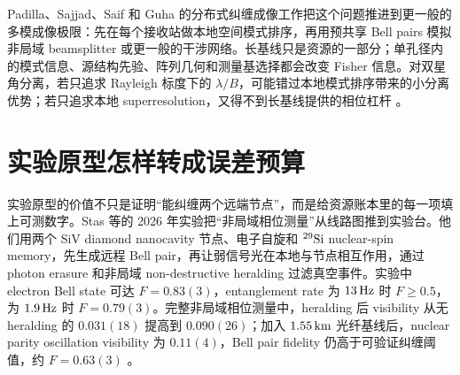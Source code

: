 Padilla、Sajjad、Saif 和 Guha 的分布式纠缠成像工作把这个问题推进到更一般的多模成像极限：先在每个接收站做本地空间模式排序，再用预共享 Bell pairs 模拟非局域 beamsplitter 或更一般的干涉网络。长基线只是资源的一部分；单孔径内的模式信息、源结构先验、阵列几何和测量基选择都会改变 Fisher 信息。对双星角分离，若只追求 Rayleigh 标度下的 \(\lambda/B\)，可能错过本地模式排序带来的小分离优势；若只追求本地 superresolution，又得不到长基线提供的相位杠杆 \citep{2026PhRvA.113a2608P,2025PhRvR...7d3278Z}。

\section{实验原型怎样转成误差预算}

实验原型的价值不只是证明“能纠缠两个远端节点”，而是给资源账本里的每一项填上可测数字。Stas 等的 2026 年实验把“非局域相位测量”从线路图推到实验台。他们用两个 SiV diamond nanocavity 节点、电子自旋和 \({}^{29}{\rm Si}\) nuclear-spin memory，先生成远程 Bell pair，再让弱信号光在本地与节点相互作用，通过 photon erasure 和非局域 non-destructive heralding 过滤真空事件。实验中 electron Bell state 可达 \(F=0.83(3)\)，entanglement rate 为 \(13\,{\rm Hz}\) 时 \(F\ge0.5\)，为 \(1.9\,{\rm Hz}\) 时 \(F=0.79(3)\)。完整非局域相位测量中，heralding 后 visibility 从无 heralding 的 \(0.031(18)\) 提高到 \(0.090(26)\)；加入 \(1.55\,{\rm km}\) 光纤基线后，nuclear parity oscillation visibility 为 \(0.11(4)\)，Bell pair fidelity 仍高于可验证纠缠阈值，约 \(F=0.63(3)\) \citep{2026Natur.651..326S}。

